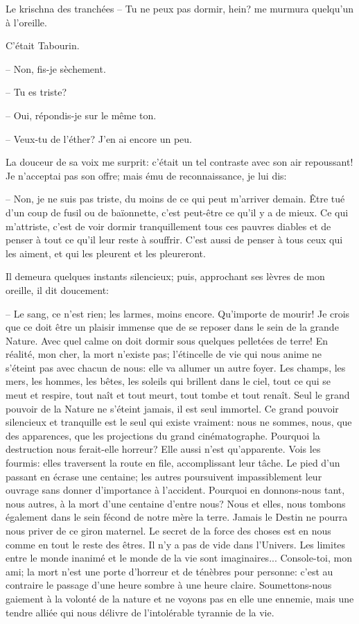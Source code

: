 \begin{chapter}{Le krischna des tranchées}
-- Tu ne peux pas dormir, hein? me murmura quelqu'un à l'oreille.

C'était Tabourin.

-- Non, fis-je sèchement.

-- Tu es triste?

-- Oui, répondis-je sur le même ton.

-- Veux-tu de l'éther? J'en ai encore un peu.

La douceur de sa voix me surprit: c'était un tel contraste avec son air
repoussant! Je n'acceptai pas son offre; mais ému de reconnaissance, je
lui dis:

-- Non, je ne suis pas triste, du moins de ce qui peut m'arriver demain.
Être tué d'un coup de fusil ou de baïonnette, c'est peut-être ce qu'il y
a de mieux. Ce qui m'attriste, c'est de voir dormir tranquillement tous
ces pauvres diables et de penser à tout ce qu'il leur reste à souffrir.
C'est aussi de penser à tous ceux qui les aiment, et qui les pleurent et
les pleureront.

Il demeura quelques instants silencieux; puis, approchant ses lèvres de
mon oreille, il dit doucement:

-- Le sang, ce n'est rien; les larmes, moins encore. Qu'importe de
mourir! Je crois que ce doit être un plaisir immense que de se reposer
dans le sein de la grande Nature. Avec quel calme on doit dormir sous
quelques pelletées de terre! En réalité, mon cher, la mort n'existe pas;
l'étincelle de vie qui nous anime ne s'éteint pas avec chacun de nous:
elle va allumer un autre foyer. Les champs, les mers, les hommes, les
bêtes, les soleils qui brillent dans le ciel, tout ce qui se meut et
respire, tout naît et tout meurt, tout tombe et tout renaît. Seul le
grand pouvoir de la Nature ne s'éteint jamais, il est seul immortel. Ce
grand pouvoir silencieux et tranquille est le seul qui existe vraiment:
nous ne sommes, nous, que des apparences, que les projections du grand
cinématographe. Pourquoi la destruction nous ferait-elle horreur? Elle
aussi n'est qu'apparente. Vois les fourmis: elles traversent la route en
file, accomplissant leur tâche. Le pied d'un passant en écrase une
centaine; les autres poursuivent impassiblement leur ouvrage sans
donner d'importance à l'accident. Pourquoi en donnons-nous tant, nous
autres, à la mort d'une centaine d'entre nous? Nous et elles, nous
tombons également dans le sein fécond de notre mère la terre. Jamais le
Destin ne pourra nous priver de ce giron maternel. Le secret de la force
des choses est en nous comme en tout le reste des êtres. Il n'y a pas de
vide dans l'Univers. Les limites entre le monde inanimé et le monde de
la vie sont imaginaires... Console-toi, mon ami; la mort n'est une porte
d'horreur et de ténèbres pour personne: c'est au contraire le passage
d'une heure sombre à une heure claire. Soumettons-nous gaiement à la
volonté de la nature et ne voyons pas en elle une ennemie, mais une
tendre alliée qui nous délivre de l'intolérable tyrannie de la vie.


\end{chapter}
